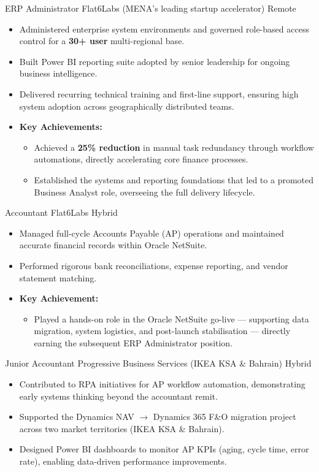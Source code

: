 \documentclass[11pt,a4paper,sans]{moderncv}
\begin{document}
%
  {ERP Administrator}%
  {Flat6Labs \textnormal{\small(MENA's leading startup accelerator)}}%
  {Remote}{}%
  {%
  \begin{itemize}
    \item Administered enterprise system environments and governed role-based access control for a
          \textbf{30+ user} multi-regional base.
    \item Built Power BI reporting suite adopted by senior leadership for ongoing business intelligence.
    \item Delivered recurring technical training and first-line support, ensuring high system
          adoption across geographically distributed teams.
    \item[\textbf{$\star$}] \textbf{Key Achievements:}
      \begin{itemize}
        \item Achieved a \textbf{25\% reduction} in manual task redundancy through workflow
              automations, directly accelerating core finance processes.
        \item Established the systems and reporting foundations that led to a promoted
              Business Analyst role, overseeing the full delivery lifecycle.
      \end{itemize}
  \end{itemize}%
  }

%
  {Accountant}%
  {Flat6Labs}%
  {Hybrid}{}%
  {%
  \begin{itemize}
    \item Managed full-cycle Accounts Payable (AP) operations and maintained accurate financial
          records within Oracle NetSuite.
    \item Performed rigorous bank reconciliations, expense reporting, and vendor statement matching.
    \item[\textbf{$\star$}] \textbf{Key Achievement:}
      \begin{itemize}
        \item Played a hands-on role in the Oracle NetSuite go-live — supporting data migration,
              system logistics, and post-launch stabilisation — directly earning the subsequent
              ERP Administrator position.
      \end{itemize}
  \end{itemize}%
  }

%
  {Junior Accountant}%
  {Progressive Business Services \textnormal{\small(IKEA KSA \& Bahrain)}}%
  {Hybrid}{}%
  {%
  \begin{itemize}
    \item Contributed to RPA initiatives for AP workflow automation, demonstrating early
          systems thinking beyond the accountant remit.
    \item Supported the Dynamics NAV $\rightarrow$ Dynamics 365 F\&O migration project
          across two market territories (IKEA KSA \& Bahrain).
    \item Designed Power BI dashboards to monitor AP KPIs (aging, cycle time, error rate),
          enabling data-driven performance improvements.
  \end{itemize}%
  }
\end{document}

